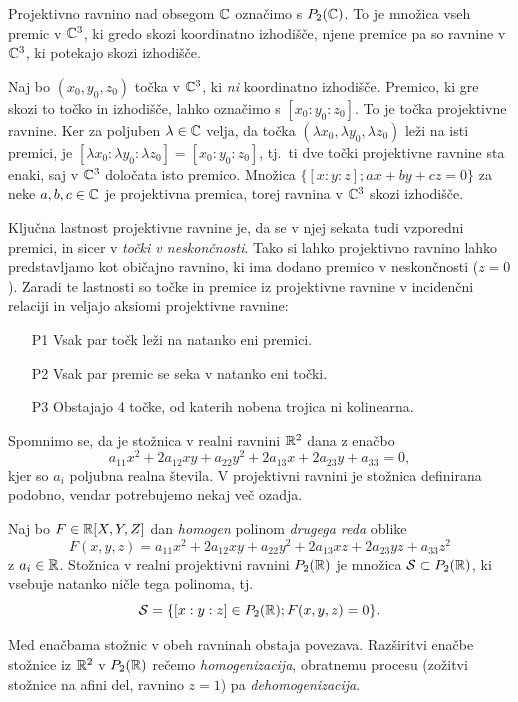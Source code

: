 \begin{definicija}
    Projektivno ravnino nad obsegom $\mathbb C$ označimo s $P_2(\mathbb C)$. To je množica vseh premic v $\mathbb C^3$, ki gredo skozi koordinatno izhodišče, njene premice pa so ravnine v $\mathbb C^3$, ki potekajo skozi izhodišče.
\end{definicija}
Naj bo $(x_0,y_0,z_0)$ točka v $\mathbb C^3$, ki \emph{ni} koordinatno izhodišče. Premico, ki gre skozi to točko in izhodišče, lahko označimo s $[x_0 : y_0 : z_0]$. To je točka projektivne ravnine. Ker za poljuben $\lambda \in \mathbb C$ velja, da točka $(\lambda x_0, \lambda y_0, \lambda z_0)$ leži na isti premici, je $[\lambda x_0 : \lambda y_0 : \lambda z_0] = [x_0 : y_0 : z_0]$, tj.\ ti dve točki projektivne ravnine sta enaki, saj v $\mathbb C^3$ določata isto premico. Množica $\{ [x:y:z]; ax+by+cz = 0\}$ za neke $a,b,c \in \mathbb C$ je projektivna premica, torej ravnina v $\mathbb C^3$ skozi izhodišče.


Ključna lastnost projektivne ravnine je, da se v njej sekata tudi vzporedni premici, in sicer v \emph{točki v neskončnosti}. Tako si lahko projektivno ravnino lahko predstavljamo kot običajno ravnino, ki ima dodano premico v neskončnosti ($z = 0$). Zaradi te lastnosti so točke in premice iz projektivne ravnine v incidenčni relaciji in veljajo aksiomi projektivne ravnine:
\begin{itemize}
    \item [P1] Vsak par točk leži na natanko eni premici.
    \item [P2] Vsak par premic se seka v natanko eni točki.
    \item [P3] Obstajajo 4 točke, od katerih nobena trojica ni kolinearna.
\end{itemize}

Spomnimo se, da je stožnica v realni ravnini $\mathbb R^2$ dana z enačbo
$$a_{11}x^2 + 2a_{12}xy + a_{22}y^2 + 2a_{13}x + 2a_{23}y + a_{33} = 0,$$
kjer so $a_i$ poljubna realna števila. V projektivni ravnini je stožnica definirana podobno, vendar potrebujemo nekaj več ozadja.
\begin{definicija}
    Naj bo $F \in \mathbb R[X,Y,Z]$ dan \emph{homogen} polinom \emph{drugega reda} oblike
    \begin{equation}
        \label{eq:stoznica_splosna}
        F(x,y,z) = a_{11}x^2 + 2a_{12}xy + a_{22}y^2 + 2a_{13}xz + 2a_{23}yz + a_{33}z^2
    \end{equation}
    z $a_i \in \mathbb R$. Stožnica v realni projektivni ravnini $P_2(\mathbb R)$ je množica $\mathcal{S} \subset P_2(\mathbb R)$, ki vsebuje natanko ničle tega polinoma, tj.
    $$ \mathcal{S} = \{[x:y:z] \in P_2(\mathbb R); F(x,y,z) = 0\}.$$  
\end{definicija}
\begin{opomba}
    Med enačbama stožnic v obeh ravninah obstaja povezava. Razširitvi enačbe stožnice iz $\mathbb R^2$ v $P_2(\mathbb R)$ rečemo \emph{homogenizacija}, obratnemu procesu (zožitvi stožnice na afini del, ravnino $z = 1$) pa \emph{dehomogenizacija}.
\end{opomba}

